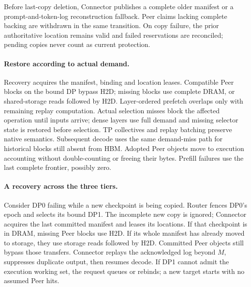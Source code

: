 Before last-copy deletion, Connector publishes a complete older manifest
or a prompt-and-token-log reconstruction fallback. Peer claims lacking
complete backing are withdrawn in the same transition. On copy failure,
the prior authoritative location remains valid and failed reservations
are reconciled; pending copies never count as current protection.

\paragraph{Restore according to actual demand.}
Recovery acquires the manifest, binding and location leases. Compatible
Peer blocks on the bound DP bypass H2D; missing blocks use complete DRAM,
or shared-storage reads followed by H2D. Layer-ordered prefetch overlaps
only with remaining replay computation. Actual selection misses block
the affected operation until inputs arrive; dense layers use full demand
and missing selector state is restored before selection. TP collectives
and replay batching preserve native semantics. Subsequent decode uses the
same demand-miss path for historical blocks still absent from HBM.
Adopted Peer objects move
to execution accounting without double-counting or freeing their bytes.
Prefill failures use the last complete frontier, possibly zero.

\paragraph{A recovery across the three tiers.}
Consider DP0 failing while a new checkpoint is being copied. Router fences
DP0's epoch and selects its bound DP1. The incomplete new copy is ignored;
Connector acquires the last committed manifest and leases its locations.
If that checkpoint is in DRAM, missing Peer blocks use H2D. If its whole
manifest has already moved to storage, they use storage reads followed by
H2D. Committed Peer objects still bypass those transfers. Connector
replays the acknowledged log beyond $M$, suppresses duplicate output,
then resumes decode. If DP1 cannot admit the execution working set, the
request queues or rebinds; a new target starts with no assumed Peer hits.


